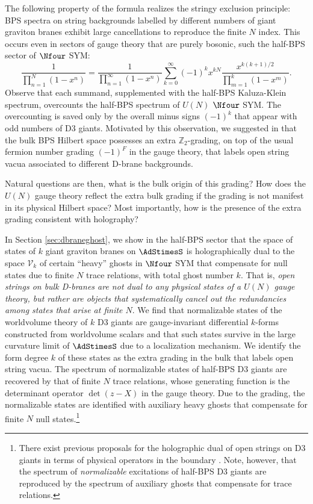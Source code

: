 \documentclass[a4paper,12pt]{article}
\begin{document}
The following property of the formula realizes the stringy exclusion principle: BPS spectra on string backgrounds labelled by different numbers of giant graviton branes exhibit large cancellations to reproduce the finite $N$ index. This occurs even in sectors of gauge theory that are purely bosonic, such the half-BPS sector of $\Nfour$ SYM:
\begin{equation} \label{eq:gge half-BPS intro}
\frac{1}{\prod_{n=1}^N (1-x^n)} = \frac{1}{\prod_{n=1}^\infty (1-x^n)} \sum_{k=0}^\infty (-1)^k x^{k N} \frac{x^{k(k+1)/2}}{\prod_{m=1}^k (1 - x^m)}.
\end{equation}
Observe that each summand, supplemented with the half-BPS Kaluza-Klein spectrum, overcounts the half-BPS spectrum of $U(N)$ $\Nfour$ SYM. The overcounting is saved only by the overall minus signs $(-1)^k$ that appear with odd numbers of D3 giants. Motivated by this observation, we suggested in \cite{Lee:2022vig} that the bulk BPS Hilbert space possesses an extra $\mathbb{Z}_2$-grading, on top of the usual fermion number grading $(-1)^F$ in the gauge theory, that labels open string vacua associated to different D-brane backgrounds.

Natural questions are then, what is the bulk origin of this grading? How does the $U(N)$ gauge theory reflect the extra bulk grading if the grading is not manifest in its physical Hilbert space? Most importantly, how is the presence of the extra grading consistent with holography?

In Section \ref{sec:dbraneghost}, we show in the half-BPS sector that the space of states of $k$ giant graviton branes on $\AdStimesS$ is holographically dual to the space $\mathcal{V}_k$ of certain ``heavy'' ghosts in $\Nfour$ SYM that compensate for null states due to finite $N$ trace relations, with total ghost number $k$. That is, \textit{open strings on bulk D-branes are not dual to any physical states of a $U(N)$ gauge theory, but rather are objects that systematically cancel out the redundancies among states that arise at finite $N$}. We find that normalizable states of the worldvolume theory of $k$ D3 giants are gauge-invariant differential $k$-forms constructed from worldvolume scalars and that such states survive in the large curvature limit of $\AdStimesS$ due to a localization mechanism. We identify the form degree $k$ of these states as the extra grading in the bulk that labels open string vacua. The spectrum of normalizable states of half-BPS D3 giants are recovered by that of finite $N$ trace relations, whose generating function is the determinant operator $\det(z - X)$ in the gauge theory. Due to the grading, the normalizable states are identified with auxiliary heavy ghosts that compensate for finite $N$ null states.\footnote{There exist previous proposals for the holographic dual of open strings on D3 giants in terms of physical operators in the boundary \cite{Balasubramanian:2002sa,Balasubramanian:2004nb,deMelloKoch:2007rqf}. Note, however, that the spectrum of \textit{normalizable} excitations of half-BPS D3 giants are reproduced by the spectrum of auxiliary ghosts that compensate for trace relations.}
\end{document}
